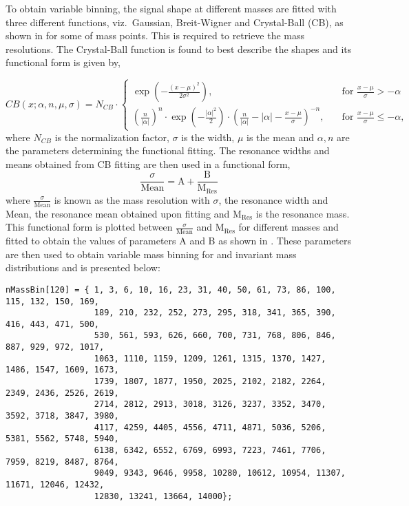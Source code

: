To obtain variable binning, the signal shape at different masses are fitted with three different functions, viz.\ Gaussian, Breit-Wigner and Crystal-Ball (CB), as
shown in \fig{\ref{fig:SigFitting}} for some of \qstar mass points. This is required to retrieve the mass resolutions. The Crystal-Ball
function is found to best describe the shapes and its functional form is given by,

\vspace{-0.3in}
\begin{equation}
CB(x; \alpha, n, \mu, \sigma) = N_{CB} \cdot \left\lbrace \begin{array}{lr}
\exp\left( -\frac{(x-\mu)^2}{2\sigma^2}\right) , & \quad \text{for } \frac{x-\mu}{\sigma} > -\alpha \\
{\left( \frac{n}{|\alpha |}\right)}^n \cdot \exp \left(-\frac{|\alpha|^2}{2}\right) \cdot \left(\frac{n}{|\alpha|}-|\alpha| - \frac{x-\mu}{\sigma}\right)^{-n} , & \quad \text{for } \frac{x-\mu}{\sigma} \leq -\alpha ,
\end{array}
\right.
\label{eq:crystalball}
\end{equation}
where $N_{CB}$ is the normalization factor, $\sigma$ is the width, $\mu$ is the mean and $\alpha, n$ are the parameters determining the functional fitting.
The resonance widths and means obtained from CB fitting are then used in a functional form,
\begin{equation}
  \frac{\sigma}{\textrm{Mean}} = \textrm{A} + \frac{\textrm{B}}{\textrm{M}_{\textrm{Res}}}
\end{equation}
where $\frac{\sigma}{\textrm{Mean}}$ is known as the mass resolution with $\sigma$, the resonance width and Mean, the resonance mean obtained upon fitting
and M$_{\textrm{Res}}$ is the resonance mass. This functional form is plotted between $\frac{\sigma}{\textrm{Mean}}$ and M$_{\textrm{Res}}$ for different masses
and fitted to obtain the values of parameters A and B as shown in \fig{\ref{fig:MassResolution}}. These parameters are then used to obtain variable mass binning
for \qstar and \bstar invariant mass distributions and is presented below:

\vspace{-0.1in}
\scriptsize
\begin{verbatim}
nMassBin[120] = { 1, 3, 6, 10, 16, 23, 31, 40, 50, 61, 73, 86, 100, 115, 132, 150, 169, 
                  189, 210, 232, 252, 273, 295, 318, 341, 365, 390, 416, 443, 471, 500, 
                  530, 561, 593, 626, 660, 700, 731, 768, 806, 846, 887, 929, 972, 1017,
                  1063, 1110, 1159, 1209, 1261, 1315, 1370, 1427, 1486, 1547, 1609, 1673, 
                  1739, 1807, 1877, 1950, 2025, 2102, 2182, 2264, 2349, 2436, 2526, 2619,
                  2714, 2812, 2913, 3018, 3126, 3237, 3352, 3470, 3592, 3718, 3847, 3980,
                  4117, 4259, 4405, 4556, 4711, 4871, 5036, 5206, 5381, 5562, 5748, 5940,
                  6138, 6342, 6552, 6769, 6993, 7223, 7461, 7706, 7959, 8219, 8487, 8764, 
                  9049, 9343, 9646, 9958, 10280, 10612, 10954, 11307, 11671, 12046, 12432,
                  12830, 13241, 13664, 14000};
\end{verbatim}
\normalsize

